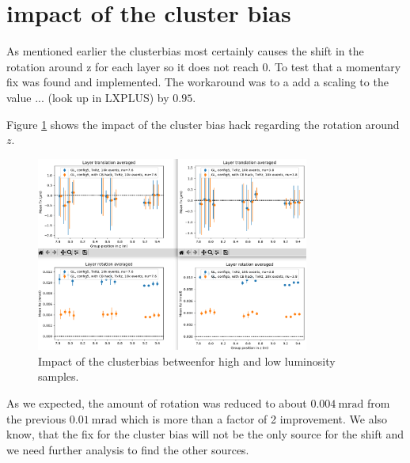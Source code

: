 
\section{impact of the cluster bias}

As mentioned earlier the clusterbias most certainly causes the shift in the rotation around z for each layer so it does not reach 0.
To test that a momentary fix was found and implemented. The workaround was to a add a scaling to the value ... (look up in LXPLUS) by $\num{0.95}$.

Figure \ref{fig:cbhack_on_off} shows the impact of the cluster bias hack regarding
the rotation around $z$.


\begin{figure}
  \centering
  \includegraphics[width=0.8\textwidth]{plots/jan_24_2022/compare_with_without_hack.png}
  \caption{Impact of the clusterbias betweenfor high and low luminosity samples.}
  \label{fig:cbhack_on_off}
\end{figure}

As we expected, the amount of rotation was reduced to about
$\SI{0.004}{\milli\radian}$ from the previous $\SI{0.01}{\milli\radian}$ which is more than a factor of 2 improvement. We also know, that the fix for the cluster bias will not be the only source for the shift and we need further analysis to find the other sources.


